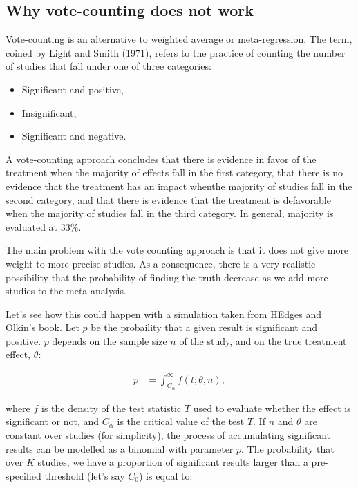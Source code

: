 \documentclass[
]{book}
\providecommand{\tightlist}{%
  \setlength{\itemsep}{0pt}\setlength{\parskip}{0pt}}
\theoremstyle{definition}
\theoremstyle{definition}
\theoremstyle{definition}
\theoremstyle{definition}
\theoremstyle{remark}
\begin{document}
\hypertarget{why-vote-counting-does-not-work}{%
\subsection{Why vote-counting does not work}\label{why-vote-counting-does-not-work}}

Vote-counting is an alternative to weighted average or meta-regression.
The term, coined by Light and Smith (1971), refers to the practice of counting the number of studies that fall under one of three categories:

\begin{itemize}
\tightlist
\item
  Significant and positive,
\item
  Insignificant,
\item
  Significant and negative.
\end{itemize}

A vote-counting approach concludes that there is evidence in favor of the treatment when the majority of effects fall in the first category, that there is no evidence that the treatment has an impact whenthe majority of studies fall in the second category, and that there is evidence that the treatment is defavorable when the majority of studies fall in the third category.
In general, majority is evaluated at 33\%.

The main problem with the vote counting approach is that it does not give more weight to more precise studies.
As a consequence, there is a very realistic possibility that the probability of finding the truth decrease as we add more studies to the meta-analysis.

Let's see how this could happen with a simulation taken from HEdges and Olkin's book.
Let \(p\) be the probaility that a given result is significant and positive.
\(p\) depends on the sample size \(n\) of the study, and on the true treatment effect, \(\theta\):

\begin{align*}
  p & = \int_{C_{\alpha}}^{\infty}f(t;\theta,n),
\end{align*}

where \(f\) is the density of the test statistic \(T\) used to evaluate whether the effect is significant or not, and \(C_{\alpha}\) is the critical value of the test \(T\).
If \(n\) and \(\theta\) are constant over studies (for simplicity), the process of accumulating significant results can be modelled as a binomial with parameter \(p\).
The probability that over \(K\) studies, we have a proportion of significant results larger than a pre-specified threshold (let's say \(C_0\)) is equal to:
\end{document}
